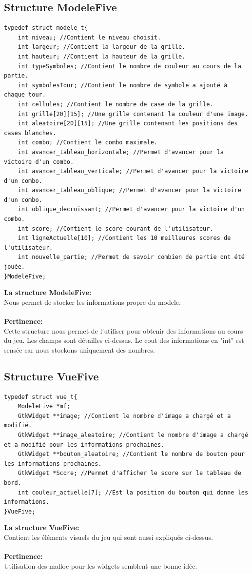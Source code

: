 \documentclass[a4paper, 11pt, oneside]{article}
\begin{document}
\subsection{Structure ModeleFive}
\begin{lstlisting}[caption={Structure modele}]
typedef struct modele_t{
    int niveau; //Contient le niveau choisit.
    int largeur; //Contient la largeur de la grille.
    int hauteur; //Contient la hauteur de la grille.
    int typeSymboles; //Contient le nombre de couleur au cours de la partie.
    int symbolesTour; //Contient le nombre de symbole a ajouté à chaque tour.
    int cellules; //Contient le nombre de case de la grille.
    int grille[20][15]; //Une grille contenant la couleur d'une image.
    int aleatoire[20][15]; //Une grille contenant les positions des cases blanches.
    int combo; //Contient le combo maximale.
    int avancer_tableau_horizontale; //Permet d'avancer pour la victoire d'un combo.
    int avancer_tableau_verticale; //Permet d'avancer pour la victoire d'un combo.
    int avancer_tableau_oblique; //Permet d'avancer pour la victoire d'un combo.
    int oblique_decroissant; //Permet d'avancer pour la victoire d'un combo.
    int score; //Contient le score courant de l'utilisateur.
    int ligneActuelle[10]; //Contient les 10 meilleures scores de l'utilisateur.
    int nouvelle_partie; //Permet de savoir combien de partie ont été jouée.
}ModeleFive;
\end{lstlisting}
\textbf{La structure ModeleFive:}\\ 
Nous permet de stocker les informations propre du modele.
\\ \\
\textbf{Pertinence:}\\
Cette structure nous permet de l'utiliser pour obtenir des informations au cours du jeu. Les champs sont détailles ci-dessus. Le cout des informations en "int" est sensée car nous stockons uniquement des nombres.

\subsection{Structure VueFive}
\begin{lstlisting}[caption={Structure vue}]
typedef struct vue_t{
    ModeleFive *mf; 
    GtkWidget **image; //Contient le nombre d'image a chargé et a modifié.
    GtkWidget **image_aleatoire; //Contient le nombre d'image a chargé et a modifié pour les informations prochaines.
    GtkWidget **bouton_aleatoire; //Contient le nombre de bouton pour les informations prochaines.
    GtkWidget *Score; //Permet d'afficher le score sur le tableau de bord.
    int couleur_actuelle[7]; //Est la position du bouton qui donne les informations.
}VueFive;
\end{lstlisting}
\textbf{La structure VueFive:}\\ 
Contient les éléments visuels du jeu qui sont aussi expliqués ci-dessus.
\\ \\
\textbf{Pertinence:}\\
 Utilisation des malloc pour les widgets semblent une bonne idée. 
\end{document}
